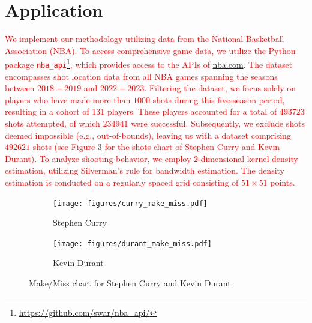 \section{Application} %
\label{sec:application}

\textcolor{red}{We implement our methodology utilizing data from the National Basketball Association (NBA). To access comprehensive game data, we utilize the Python package \texttt{nba\_api}\footnote{\url{https://github.com/swar/nba_api/}}, which provides access to the APIs of \url{nba.com}. The dataset encompasses shot location data from all NBA games spanning the seasons between $2018-2019$ and $2022-2023$. Filtering the dataset, we focus solely on players who have made more than $1000$ shots during this five-season period, resulting in a cohort of $131$ players. These players accounted for a total of $493723$ shots attempted, of which $234941$ were successful. Subsequently, we exclude shots deemed impossible (e.g., out-of-bounds), leaving us with a dataset comprising $492621$ shots (see Figure \ref{fig:shoots_make_miss} for the shots chart of Stephen Curry and Kevin Durant). To analyze shooting behavior, we employ 2-dimensional kernel density estimation, utilizing Silverman's rule \citep{silvermanDensityEstimationStatistics1986} for bandwidth estimation. The density estimation is conducted on a regularly spaced grid consisting of $51 \times 51$ points.}

\begin{figure}
    \centering
    \begin{subfigure}[b]{0.49\textwidth}
        \centering
        \texttt{[image: figures/curry\_make\_miss.pdf]}
        \caption{Stephen Curry}
        \label{fig:curry_make_miss}
    \end{subfigure}
    \hfill
    \begin{subfigure}[b]{0.49\textwidth}
        \centering
        \texttt{[image: figures/durant\_make\_miss.pdf]}
        \caption{Kevin Durant}
        \label{fig:durant_make_miss}
    \end{subfigure}
    \caption{Make/Miss chart for Stephen Curry and Kevin Durant.}
    \label{fig:shoots_make_miss}
\end{figure}


